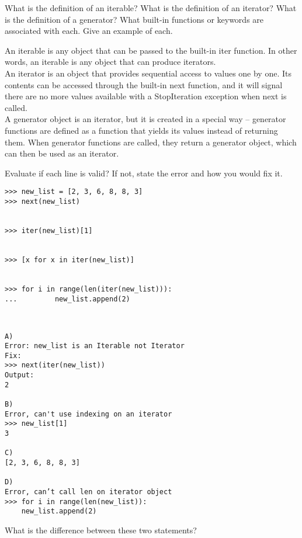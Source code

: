 \question
What is the definition of an iterable? What is the definition of an iterator? What is the definition of a generator? What built-in functions or keywords are associated with each. Give an example of each.

\begin{solution}[2in]
An iterable is any object that can be passed to the built-in iter function. In other words, an iterable is any object that can produce iterators. \\
An iterator is an object that provides sequential access to values one by one. Its contents can be accessed through the built-in next function, and it will signal there are no more values available with a StopIteration exception when next is called. \\
A generator object is an iterator, but it is created in a special way -- generator functions are defined as a function that yields its values instead of returning them. When generator functions are called, they return a generator object, which can then be used as an iterator.

\end{solution}

\question
Evaluate if each line is valid? If not, state the error and how you would fix it.

\begin{lstlisting}
>>> new_list = [2, 3, 6, 8, 8, 3]
>>> next(new_list)


>>> iter(new_list)[1]


>>> [x for x in iter(new_list)]


>>> for i in range(len(iter(new_list))):
... 		new_list.append(2)


\end{lstlisting}

\begin{solution}[1in]
\begin{verbatim}

A)
Error: new_list is an Iterable not Iterator
Fix:
>>> next(iter(new_list))
Output:
2

B)
Error, can't use indexing on an iterator
>>> new_list[1]
3

C)
[2, 3, 6, 8, 8, 3]

D)
Error, can’t call len on iterator object
>>> for i in range(len(new_list)):
	new_list.append(2)

\end{verbatim}
\end{solution}
\newpage

\question
What is the difference between these two statements?

